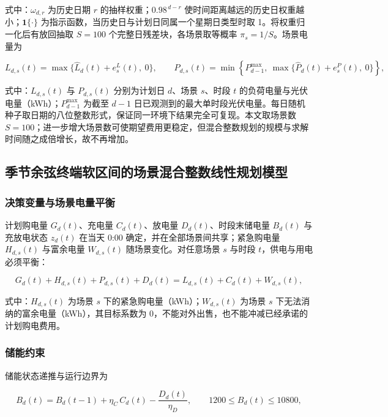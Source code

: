 式中：$\omega_{d,r}$ 为历史日期 $r$ 的抽样权重；$0.98^{\,d-r}$ 使时间距离越远的历史日权重越小；$\mathbf{1}\{\cdot\}$ 为指示函数，当历史日与计划日同属一个星期日类型时取 1。将权重归一化后有放回抽取 $S=100$ 个完整日残差块，各场景取等概率 $\pi_s = 1/S$。场景电量为

\begin{equation}
  L_{d,s}(t) = \max\{\widehat{L}_d(t) + e^L_s(t),\ 0\},
  \qquad
  P_{d,s}(t) = \min\left\{ P^{\max}_{d-1},\ \max\{\widehat{P}_d(t) + e^P_s(t),\ 0\} \right\},
  \label{eq:scenario}
\end{equation}

式中：$L_{d,s}(t)$ 与 $P_{d,s}(t)$ 分别为计划日 $d$、场景 $s$、时段 $t$ 的负荷电量与光伏电量（kWh）；$P^{\max}_{d-1}$ 为截至 $d-1$ 日已观测到的最大单时段光伏电量。每日随机种子取日期的八位整数形式，保证同一环境下结果完全可复现。本文取场景数 $S=100$；进一步增大场景数可使期望费用更稳定，但混合整数规划的规模与求解时间随之成倍增长，故不再增加。

\subsection{季节余弦终端软区间的场景混合整数线性规划模型}

\subsubsection{决策变量与场景电量平衡}

计划购电量 $G_d(t)$、充电量 $C_d(t)$、放电量 $D_d(t)$、时段末储电量 $B_d(t)$ 与充放电状态 $z_d(t)$ 在当天 0:00 确定，并在全部场景间共享；紧急购电量 $H_{d,s}(t)$ 与富余电量 $W_{d,s}(t)$ 随场景变化。对任意场景 $s$ 与时段 $t$，供电与用电必须平衡：

\begin{equation}
  G_d(t) + H_{d,s}(t) + P_{d,s}(t) + D_d(t) = L_{d,s}(t) + C_d(t) + W_{d,s}(t),
  \label{eq:q2_balance}
\end{equation}

式中：$H_{d,s}(t)$ 为场景 $s$ 下的紧急购电量（kWh）；$W_{d,s}(t)$ 为场景 $s$ 下无法消纳的富余电量（kWh），其目标系数为 0，不能对外出售，也不能冲减已经承诺的计划购电费用。

\subsubsection{储能约束}

储能状态递推与运行边界为

\begin{equation}
  B_d(t) = B_d(t-1) + \eta_C\,C_d(t) - \frac{D_d(t)}{\eta_D},
  \qquad
  1200 \le B_d(t) \le 10800,
  \label{eq:q2_soc}
\end{equation}

